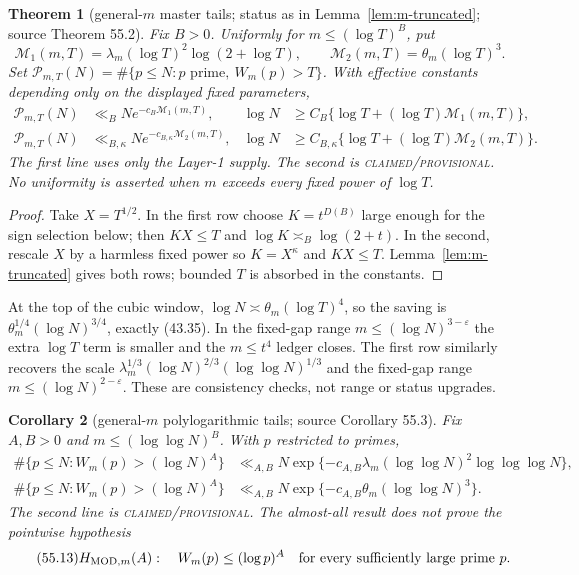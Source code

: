 \documentclass[10pt,reqno]{amsart}
\newtheorem{theorem}{Theorem}[section]
\newtheorem{corollary}[theorem]{Corollary}
\theoremstyle{definition}
\newcommand{\1}{\mathbf 1}
\newcommand{\eps}{\varepsilon}
\begin{document}
\begin{theorem}[general-$m$ master tails; status as in
Lemma~\ref{lem:m-truncated}; source Theorem 55.2]
\label{thm:general-m-tails}
Fix $B>0$.  Uniformly for $m\leq(\log T)^B$, put
\begin{equation}\tag{55.10}
 \mathcal M_1(m,T)=\lambda_m(\log T)^2\log(2+\log T),\qquad
 \mathcal M_2(m,T)=\theta_m(\log T)^3.
\end{equation}
Set $\mathcal P_{m,T}(N)=
\#\{p\leq N:p\text{ prime},\ W_m(p)>T\}$.  With effective constants
depending only on the displayed fixed parameters,
\begin{equation}\tag{55.11}
\begin{aligned}
 \mathcal P_{m,T}(N)&\ll_BNe^{-c_B\mathcal M_1(m,T)},&
 \log N&\geq C_B\{\log T+(\log T)\mathcal M_1(m,T)\},\\
 \mathcal P_{m,T}(N)&\ll_{B,\kappa}Ne^{-c_{B,\kappa}\mathcal M_2(m,T)},&
 \log N&\geq C_{B,\kappa}\{\log T+(\log T)\mathcal M_2(m,T)\}.
\end{aligned}
\end{equation}
The first line uses only the Layer-1 supply.  The second is
\textsc{claimed/provisional}.  No uniformity is asserted when $m$ exceeds
every fixed power of $\log T$.
\end{theorem}
\begin{proof}
Take $X=T^{1/2}$.  In the first row choose $K=t^{D(B)}$ large enough for the
sign selection below; then $KX\leq T$ and
$\log K\asymp_B\log(2+t)$.  In the second, rescale $X$ by a harmless fixed
power so $K=X^\kappa$ and $KX\leq T$.  Lemma~\ref{lem:m-truncated} gives
both rows; bounded $T$ is absorbed in the constants.
\end{proof}
At the top of the cubic window,
$\log N\asymp\theta_m(\log T)^4$, so the saving is
$\theta_m^{1/4}(\log N)^{3/4}$, exactly (43.35).  In the fixed-gap range
$m\leq(\log N)^{3-\eps}$ the extra $\log T$ term is smaller and the
$m\leq t^4$ ledger closes.  The first row similarly recovers the scale
$\lambda_m^{1/3}(\log N)^{2/3}(\log\log N)^{1/3}$ and the fixed-gap range
$m\leq(\log N)^{2-\eps}$.  These are consistency checks, not range or status
upgrades.

\begin{corollary}[general-$m$ polylogarithmic tails; source Corollary 55.3]
Fix $A,B>0$ and $m\leq(\log\log N)^B$.  With $p$ restricted to primes,
\begin{equation}\tag{55.12}
 \begin{split}
 \#\{p\leq N:W_m(p)>(\log N)^A\}
 &\ll_{A,B}N\exp\{-c_{A,B}\lambda_m
       (\log\log N)^2\log\log\log N\},\\
 \#\{p\leq N:W_m(p)>(\log N)^A\}
 &\ll_{A,B}N\exp\{-c_{A,B}\theta_m(\log\log N)^3\}.
 \end{split}
\end{equation}
The second line is \textsc{claimed/provisional}.  The almost-all result does
not prove the pointwise hypothesis
\begin{equation}\tag{55.13}
 H_{{\rm MOD},m}(A):\quad W_m(p)\leq(\log p)^A
 \quad\hbox{for every sufficiently large prime }p.
\end{equation}
\end{corollary}
\end{document}
